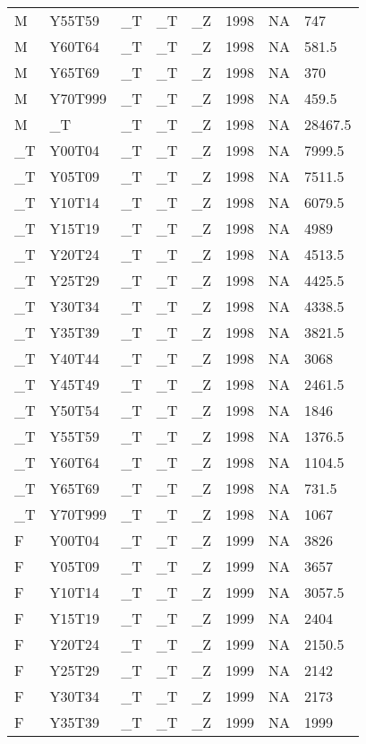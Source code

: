 \begin{longtable}[t]{llllllll}
M & Y55T59 & \_T & \_T & \_Z & 1998 & NA & 747\\
M & Y60T64 & \_T & \_T & \_Z & 1998 & NA & 581.5\\
M & Y65T69 & \_T & \_T & \_Z & 1998 & NA & 370\\
M & Y70T999 & \_T & \_T & \_Z & 1998 & NA & 459.5\\
\addlinespace
M & \_T & \_T & \_T & \_Z & 1998 & NA & 28467.5\\
\_T & Y00T04 & \_T & \_T & \_Z & 1998 & NA & 7999.5\\
\_T & Y05T09 & \_T & \_T & \_Z & 1998 & NA & 7511.5\\
\_T & Y10T14 & \_T & \_T & \_Z & 1998 & NA & 6079.5\\
\_T & Y15T19 & \_T & \_T & \_Z & 1998 & NA & 4989\\
\addlinespace
\_T & Y20T24 & \_T & \_T & \_Z & 1998 & NA & 4513.5\\
\_T & Y25T29 & \_T & \_T & \_Z & 1998 & NA & 4425.5\\
\_T & Y30T34 & \_T & \_T & \_Z & 1998 & NA & 4338.5\\
\_T & Y35T39 & \_T & \_T & \_Z & 1998 & NA & 3821.5\\
\_T & Y40T44 & \_T & \_T & \_Z & 1998 & NA & 3068\\
\addlinespace
\_T & Y45T49 & \_T & \_T & \_Z & 1998 & NA & 2461.5\\
\_T & Y50T54 & \_T & \_T & \_Z & 1998 & NA & 1846\\
\_T & Y55T59 & \_T & \_T & \_Z & 1998 & NA & 1376.5\\
\_T & Y60T64 & \_T & \_T & \_Z & 1998 & NA & 1104.5\\
\_T & Y65T69 & \_T & \_T & \_Z & 1998 & NA & 731.5\\
\addlinespace
\_T & Y70T999 & \_T & \_T & \_Z & 1998 & NA & 1067\\
F & Y00T04 & \_T & \_T & \_Z & 1999 & NA & 3826\\
F & Y05T09 & \_T & \_T & \_Z & 1999 & NA & 3657\\
F & Y10T14 & \_T & \_T & \_Z & 1999 & NA & 3057.5\\
F & Y15T19 & \_T & \_T & \_Z & 1999 & NA & 2404\\
\addlinespace
F & Y20T24 & \_T & \_T & \_Z & 1999 & NA & 2150.5\\
F & Y25T29 & \_T & \_T & \_Z & 1999 & NA & 2142\\
F & Y30T34 & \_T & \_T & \_Z & 1999 & NA & 2173\\
F & Y35T39 & \_T & \_T & \_Z & 1999 & NA & 1999\\

\end{longtable}
